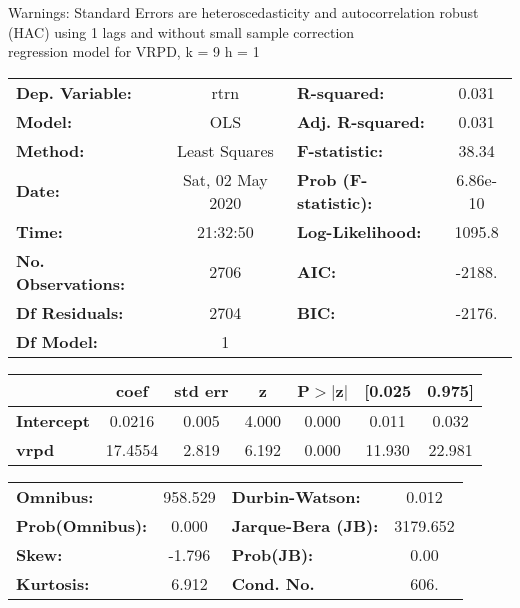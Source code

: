 Warnings: \newline
 [1] Standard Errors are heteroscedasticity and autocorrelation robust (HAC) using 1 lags and without small sample correction\\ 

regression model for VRPD, k = 9 h = 1\begin{center}
\begin{tabular}{lclc}
\toprule
\textbf{Dep. Variable:}    &       rtrn       & \textbf{  R-squared:         } &     0.031   \\
\textbf{Model:}            &       OLS        & \textbf{  Adj. R-squared:    } &     0.031   \\
\textbf{Method:}           &  Least Squares   & \textbf{  F-statistic:       } &     38.34   \\
\textbf{Date:}             & Sat, 02 May 2020 & \textbf{  Prob (F-statistic):} &  6.86e-10   \\
\textbf{Time:}             &     21:32:50     & \textbf{  Log-Likelihood:    } &    1095.8   \\
\textbf{No. Observations:} &        2706      & \textbf{  AIC:               } &    -2188.   \\
\textbf{Df Residuals:}     &        2704      & \textbf{  BIC:               } &    -2176.   \\
\textbf{Df Model:}         &           1      & \textbf{                     } &             \\
\bottomrule
\end{tabular}
\begin{tabular}{lcccccc}
                   & \textbf{coef} & \textbf{std err} & \textbf{z} & \textbf{P$> |$z$|$} & \textbf{[0.025} & \textbf{0.975]}  \\
\midrule
\textbf{Intercept} &       0.0216  &        0.005     &     4.000  &         0.000        &        0.011    &        0.032     \\
\textbf{vrpd}      &      17.4554  &        2.819     &     6.192  &         0.000        &       11.930    &       22.981     \\
\bottomrule
\end{tabular}
\begin{tabular}{lclc}
\textbf{Omnibus:}       & 958.529 & \textbf{  Durbin-Watson:     } &    0.012  \\
\textbf{Prob(Omnibus):} &   0.000 & \textbf{  Jarque-Bera (JB):  } & 3179.652  \\
\textbf{Skew:}          &  -1.796 & \textbf{  Prob(JB):          } &     0.00  \\
\textbf{Kurtosis:}      &   6.912 & \textbf{  Cond. No.          } &     606.  \\
\bottomrule
\end{tabular}
\end{center}

